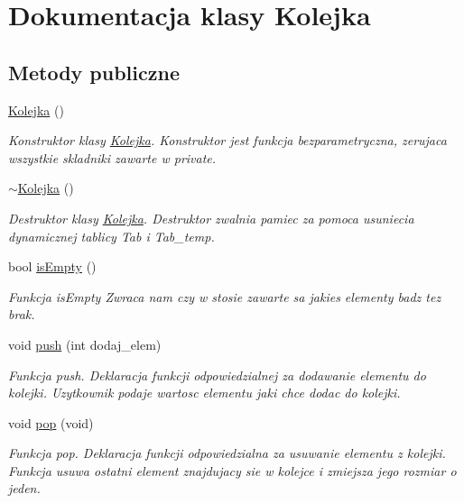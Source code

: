 \hypertarget{class_kolejka}{\section{\-Dokumentacja klasy \-Kolejka}
\label{class_kolejka}
}
\subsection*{\-Metody publiczne}
\begin{DoxyCompactItemize}
\item 
\hyperlink{class_kolejka_a37c886fdc73dce62b04da0381dec5484}{\-Kolejka} ()
\begin{DoxyCompactList}\small\item\em \-Konstruktor klasy \hyperlink{class_kolejka}{\-Kolejka}. \-Konstruktor jest funkcja bezparametryczna, zerujaca wszystkie skladniki zawarte w private. \end{DoxyCompactList}\item 
\hyperlink{class_kolejka_a352f86ff08cd47be6c35c60bb0f873a6}{$\sim$\-Kolejka} ()
\begin{DoxyCompactList}\small\item\em \-Destruktor klasy \hyperlink{class_kolejka}{\-Kolejka}. \-Destruktor zwalnia pamiec za pomoca usuniecia dynamicznej tablicy \-Tab i \-Tab\-\_\-temp. \end{DoxyCompactList}\item 
bool \hyperlink{class_kolejka_a0106bd9157a970b63a06edd1dad350a9}{is\-Empty} ()
\begin{DoxyCompactList}\small\item\em \-Funkcja is\-Empty \-Zwraca nam czy w stosie zawarte sa jakies elementy badz tez brak. \end{DoxyCompactList}\item 
void \hyperlink{class_kolejka_ae69532510bff2585c5dfe6c6d40a779d}{push} (int dodaj\-\_\-elem)
\begin{DoxyCompactList}\small\item\em \-Funkcja push. \-Deklaracja funkcji odpowiedzialnej za dodawanie elementu do kolejki. \-Uzytkownik podaje wartosc elementu jaki chce dodac do kolejki. \end{DoxyCompactList}\item 
void \hyperlink{class_kolejka_a9a637b21a46f6330d774f03e16bd003e}{pop} (void)
\begin{DoxyCompactList}\small\item\em \-Funkcja pop. \-Deklaracja funkcji odpowiedzialna za usuwanie elementu z kolejki. \-Funkcja usuwa ostatni element znajdujacy sie w kolejce i zmiejsza jego rozmiar o jeden. \end{DoxyCompactList}\item 

\end{DoxyCompactItemize}
